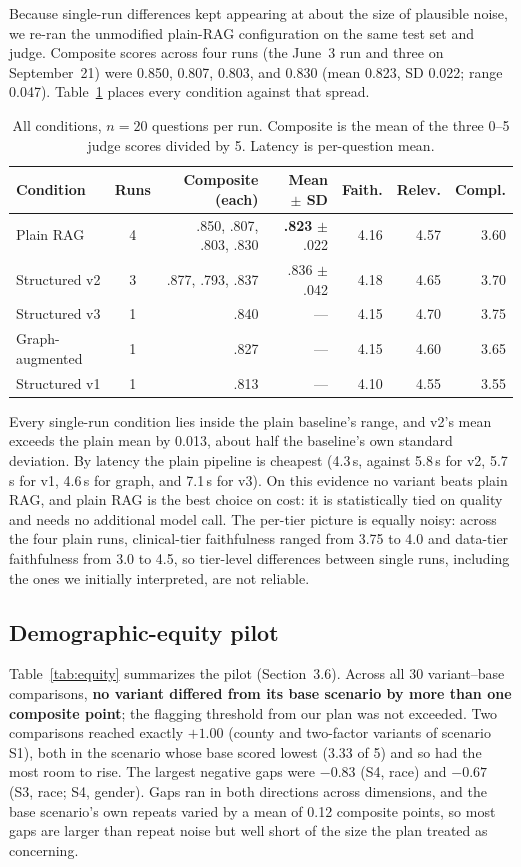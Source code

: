 \documentclass[11pt]{article}
\begin{document}
Because single-run differences kept appearing at about the size of plausible noise, we re-ran the unmodified plain-RAG configuration on the same test set and judge. Composite scores across four runs (the June~3 run and three on September~21) were 0.850, 0.807, 0.803, and 0.830 (mean 0.823, SD 0.022; range 0.047). Table~\ref{tab:allconditions} places every condition against that spread.

\begin{table}[h]
\centering
\caption{All conditions, $n=20$ questions per run. Composite is the mean of the three 0--5 judge scores divided by 5. Latency is per-question mean.}
\label{tab:allconditions}
\begin{tabular}{lcrrrrr}
\toprule
Condition & Runs & Composite (each) & Mean $\pm$ SD & Faith. & Relev. & Compl. \\
\midrule
Plain RAG & 4 & .850, .807, .803, .830 & \textbf{.823} $\pm$ .022 & 4.16 & 4.57 & 3.60 \\
Structured v2 & 3 & .877, .793, .837 & .836 $\pm$ .042 & 4.18 & 4.65 & 3.70 \\
Structured v3 & 1 & .840 & --- & 4.15 & 4.70 & 3.75 \\
Graph-augmented & 1 & .827 & --- & 4.15 & 4.60 & 3.65 \\
Structured v1 & 1 & .813 & --- & 4.10 & 4.55 & 3.55 \\
\bottomrule
\end{tabular}
\end{table}

Every single-run condition lies inside the plain baseline's range, and v2's mean exceeds the plain mean by 0.013, about half the baseline's own standard deviation. By latency the plain pipeline is cheapest (4.3\,s, against 5.8\,s for v2, 5.7\,s for v1, 4.6\,s for graph, and 7.1\,s for v3). On this evidence no variant beats plain RAG, and plain RAG is the best choice on cost: it is statistically tied on quality and needs no additional model call. The per-tier picture is equally noisy: across the four plain runs, clinical-tier faithfulness ranged from 3.75 to 4.0 and data-tier faithfulness from 3.0 to 4.5, so tier-level differences between single runs, including the ones we initially interpreted, are not reliable.


\subsection{Demographic-equity pilot}

Table~\ref{tab:equity} summarizes the pilot (Section~3.6). Across all 30 variant--base comparisons, \textbf{no variant differed from its base scenario by more than one composite point}; the flagging threshold from our plan was not exceeded. Two comparisons reached exactly $+1.00$ (county and two-factor variants of scenario S1), both in the scenario whose base scored lowest (3.33 of 5) and so had the most room to rise. The largest negative gaps were $-0.83$ (S4, race) and $-0.67$ (S3, race; S4, gender). Gaps ran in both directions across dimensions, and the base scenario's own repeats varied by a mean of 0.12 composite points, so most gaps are larger than repeat noise but well short of the size the plan treated as concerning.
\end{document}

